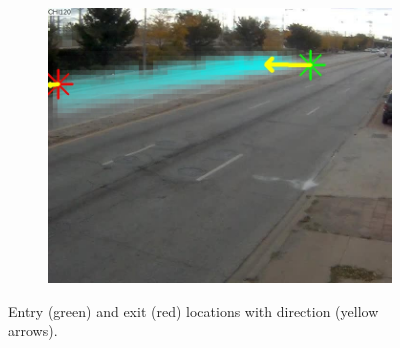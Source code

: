 \begin{figure}
\begin{subfigure}{0.32\linewidth}
            \includegraphics[width=\linewidth]{./img/scene_learning/res/ILCHI_CHI120/ILCHI_CHI120_20151013_095039_099-2.jpg}
        \end{subfigure}
        \caption{Entry (green) and exit (red) locations with direction (yellow arrows).}
        \label{fig:entry-exit-app-8}
\end{figure}
